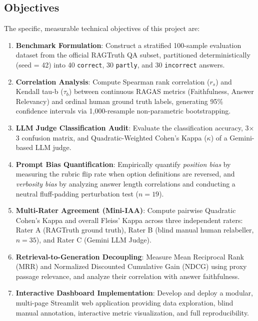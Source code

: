 \documentclass[11pt,a4paper]{article}
\begin{document}
\subsection{Objectives}
The specific, measurable technical objectives of this project are:
\begin{enumerate}[leftmargin=*]
    \item \textbf{Benchmark Formulation}: Construct a stratified 100-sample evaluation dataset from the official RAGTruth QA subset, partitioned deterministically (seed = 42) into 40 \texttt{correct}, 30 \texttt{partly}, and 30 \texttt{incorrect} answers.
    \item \textbf{Correlation Analysis}: Compute Spearman rank correlation ($r_s$) and Kendall tau-b ($\tau_b$) between continuous RAGAS metrics (Faithfulness, Answer Relevancy) and ordinal human ground truth labels, generating 95\% confidence intervals via 1,000-resample non-parametric bootstrapping.
    \item \textbf{LLM Judge Classification Audit}: Evaluate the classification accuracy, 3$\times$3 confusion matrix, and Quadratic-Weighted Cohen's Kappa ($\kappa$) of a Gemini-based LLM judge.
    \item \textbf{Prompt Bias Quantification}: Empirically quantify \textit{position bias} by measuring the rubric flip rate when option definitions are reversed, and \textit{verbosity bias} by analyzing answer length correlations and conducting a neutral fluff-padding perturbation test ($n=19$).
    \item \textbf{Multi-Rater Agreement (Mini-IAA)}: Compute pairwise Quadratic Cohen's Kappa and overall Fleiss' Kappa across three independent raters: Rater A (RAGTruth ground truth), Rater B (blind manual human relabeller, $n=35$), and Rater C (Gemini LLM Judge).
    \item \textbf{Retrieval-to-Generation Decoupling}: Measure Mean Reciprocal Rank (MRR) and Normalized Discounted Cumulative Gain (NDCG) using proxy passage relevance, and analyze their correlation with answer faithfulness.
    \item \textbf{Interactive Dashboard Implementation}: Develop and deploy a modular, multi-page Streamlit web application providing data exploration, blind manual annotation, interactive metric visualization, and full reproducibility.
\end{enumerate}
\end{document}
